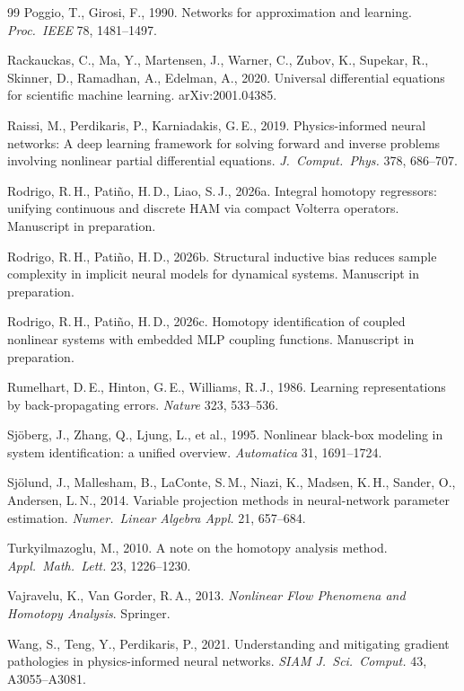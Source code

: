 \documentclass[preprint,12pt,numbers]{elsarticle}
\begin{document}
\begin{thebibliography}{99}
Poggio, T., Girosi, F., 1990. Networks for approximation and learning.
\emph{Proc.\ IEEE} 78, 1481--1497.

Rackauckas, C., Ma, Y., Martensen, J., Warner, C., Zubov, K., Supekar,
R., Skinner, D., Ramadhan, A., Edelman, A., 2020. Universal differential
equations for scientific machine learning. arXiv:2001.04385.

Raissi, M., Perdikaris, P., Karniadakis, G.\,E., 2019. Physics-informed
neural networks: A deep learning framework for solving forward and
inverse problems involving nonlinear partial differential equations.
\emph{J.\ Comput.\ Phys.} 378, 686--707.

Rodrigo, R.\,H., Pati\~no, H.\,D., Liao, S.\,J., 2026a. Integral
homotopy regressors: unifying continuous and discrete HAM via compact
Volterra operators. Manuscript in preparation.

Rodrigo, R.\,H., Pati\~no, H.\,D., 2026b. Structural inductive bias
reduces sample complexity in implicit neural models for dynamical
systems. Manuscript in preparation.

Rodrigo, R.\,H., Pati\~no, H.\,D., 2026c. Homotopy identification of
coupled nonlinear systems with embedded MLP coupling functions.
Manuscript in preparation.

Rumelhart, D.\,E., Hinton, G.\,E., Williams, R.\,J., 1986. Learning
representations by back-propagating errors. \emph{Nature} 323,
533--536.

Sj\"oberg, J., Zhang, Q., Ljung, L., et al., 1995. Nonlinear black-box
modeling in system identification: a unified overview. \emph{Automatica}
31, 1691--1724.

Sj\"olund, J., Mallesham, B., LaConte, S.\,M., Niazi, K., Madsen, K.\,H.,
Sander, O., Andersen, L.\,N., 2014. Variable projection methods in
neural-network parameter estimation. \emph{Numer.\ Linear Algebra
Appl.} 21, 657--684.

Turkyilmazoglu, M., 2010. A note on the homotopy analysis method.
\emph{Appl.\ Math.\ Lett.} 23, 1226--1230.

Vajravelu, K., Van Gorder, R.\,A., 2013. \emph{Nonlinear Flow Phenomena
and Homotopy Analysis}. Springer.

Wang, S., Teng, Y., Perdikaris, P., 2021. Understanding and mitigating
gradient pathologies in physics-informed neural networks. \emph{SIAM
J.\ Sci.\ Comput.} 43, A3055--A3081.

\end{thebibliography}
\end{document}
